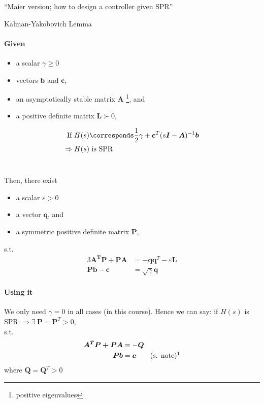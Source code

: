 ``Maier version; how to design a controller given SPR''\\

\begin{lemma}{Kalman-Yakobovich Lemma}
    \paragraph{Given}
    \begin{itemize}
    \item a scalar $\gamma \geq 0$
    \item vectors $\bm{b}$ and $\bm{c}$,
    \item an asymptotically stable matrix $\bm{A}$%
        \footnote{positive eigenvalues}, and
    \item a positive definite matrix $\bm{L} \succ 0$,
    \end{itemize}
    \begin{alignat*}{3}
    \txt{If } H(s) &\corresponds \frac{1}{2} \gamma + \bm{c}^T (s\bm{I}-\bm{A})^{-1} \bm{b}\\
        \Rightarrow H(s) &\txt{ is SPR}
    \end{alignat*}~

    Then, there exist
    \begin{itemize}
    \item a scalar $\varepsilon >0$
    \item a vector $\bm{q}$, and
    \item a symmetric positive definite matrix $\bm{P}$,
    \end{itemize}
    s.t.
    \begin{alignat}{3}
    \bm{A^TP + PA}   &= -\bm{qq}^T - \varepsilon \bm{L}
        \label{eq:ky-lemma-atp}\\
    \bm{Pb} - \bm{c}      &= \sqrt{\gamma} \bm{q}
        \label{eq:ky-lemma-bc}
    \end{alignat}
\end{lemma}

\paragraph{Using it}
We only need $\gamma=0$ in all cases (in this course).
Hence we can say: if $H(s)$ is SPR $\Rightarrow \exists ~ \bm{P}=\bm{P}^T>0$,\\
s.t.
\begin{alignat*}{3}
\bm{A^TP + PA}   &= -\bm{Q}\\
\bm{Pb} &= \bm{c} \qquad \txt{(s. note)}\footnotemark  \\
\end{alignat*}%
%
where $\bm{Q}=\bm{Q}^T>0$

